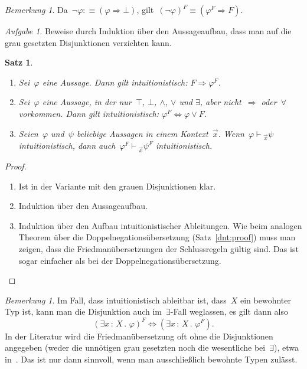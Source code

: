 \documentclass[a4paper,ngerman,12pt]{scrartcl}
\theoremstyle{definition}
\theoremstyle{plain}
\newtheorem{satz}[defn]{Satz}
\theoremstyle{remark}
\newtheorem{bem}[defn]{Bemerkung}
\newtheorem{aufg}[defn]{Aufgabe}
\newcommand{\seq}[1]{\mathrel{\vdash\!\!\!_{#1}}}
\renewcommand{\_}{\mathpunct{.}\,}
\newcommand{\?}{\,{:}\,}
\begin{document}
\begin{bem}Da~$\neg\varphi :\equiv (\varphi \Rightarrow \bot)$,
gilt~$(\neg\varphi)^F \equiv (\varphi^F \Rightarrow F)$.\end{bem}

\begin{aufg}Beweise durch Induktion über den Aussageaufbau, dass man auf die grau
gesetzten Disjunktionen verzichten kann.\end{aufg}

\begin{satz}\label{friedman:proof}
\begin{enumerate}
\item Sei~$\varphi$ eine Aussage. Dann gilt intuitionistisch: $F \Longrightarrow \varphi^F$.

\item Sei~$\varphi$ eine Aussage, in der nur~$\top$, $\bot$,
$\wedge$, $\vee$ und $\exists$, aber nicht~$\Rightarrow$ oder~$\forall$ vorkommen.
Dann gilt intuitionistisch: $\varphi^F \Longleftrightarrow \varphi \vee F$.

\item Seien~$\varphi$ und~$\psi$ beliebige Aussagen in einem Kontext~$\vec x$.
Wenn~$\varphi \seq{\vec x} \psi$ intuitionistisch, dann auch~$\varphi^F
\seq{\vec x} \psi^F$ intuitionistisch.
\end{enumerate}
\end{satz}
\begin{proof}
\begin{enumerate}
\item Ist in der Variante mit den grauen Disjunktionen klar.
\item Induktion über den Aussageaufbau.
\item Induktion über den Aufbau intuitionistischer Ableitungen. Wie beim
analogen Theorem über die Doppelnegationsübersetzung (Satz~\ref{dnt:proof})
muss man zeigen, dass die Friedmanübersetzungen der Schlussregeln gültig sind.
Das ist sogar einfacher als bei der Doppelnegationsübersetzung.\qedhere
\end{enumerate}
\end{proof}

\begin{bem}Im Fall, dass intuitionistisch ableitbar ist, dass~$X$ ein bewohnter
Typ ist, kann man die Disjunktion auch im~$\exists$-Fall weglassen, es gilt
dann also
\[ (\exists x\?X\_ \varphi)^F \Longleftrightarrow (\exists x\?X\_ \varphi^F).
\]
In der Literatur wird die Friedmanübersetzung oft ohne die Disjunktionen
angegeben (weder die unnötigen grau gesetzten noch die wesentliche bei~$\exists$), etwa
in~\cite{coquand:classical}. Das ist nur dann sinnvoll, wenn man ausschließlich
bewohnte Typen zulässt.
\end{bem}
\end{document}

